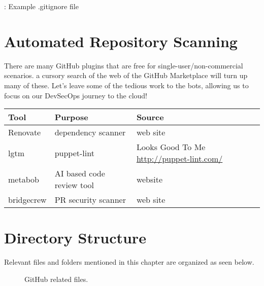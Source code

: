 \begin{mybox}{\thetcbcounter: Example .gitignore file}
      
\end{mybox}

\section{Automated Repository Scanning}

\justifying
There are many GitHub plugins that are free for single-user/non-commercial scenarios. a cursory search of the web of the
GitHub Marketplace will turn up many of these. Let's leave some of the
tedious work to the bots, allowing us to focus on our DevSecOps journey to the cloud!

\justifying
\begin{tabular}{| p{2.3cm}| p{4.5cm} | p{8.5cm} |}
      \hline
     \textbf{Tool}& \textbf{Purpose}& \textbf{Source} \\
      \hline
      Renovate & dependency scanner & web site \\
      \hline
      lgtm & puppet-lint & Looks Good To Me \url{http://puppet-lint.com/} \\
      \hline
      metabob & AI based code review tool & website \\
      \hline
      bridgecrew & PR security scanner & web site \\
      \hline
\end{tabular}

\section{Directory Structure}

\justifying
Relevant files and folders mentioned in this chapter are organized as seen below.

\begin{figure}[!htb]
      \centering
      
      \caption{GitHub related files.}
      \label{githubfiles}
\end{figure}

